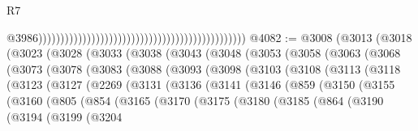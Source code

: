 \begin{lexlean}{R7}
\begin{coremodule}
                                                                                                  @3986)))))))))))))))))))))))))))))))))))))))))))))))
@4082 := @3008
    (@3013
      (@3018
        (@3023
          (@3028
            (@3033
              (@3038
                (@3043
                  (@3048
                    (@3053
                      (@3058
                        (@3063
                          (@3068
                            (@3073
                              (@3078
                                (@3083
                                  (@3088
                                    (@3093
                                      (@3098
                                        (@3103
                                          (@3108
                                            (@3113
                                              (@3118
                                                (@3123
                                                  (@3127
                                                    (@2269
                                                      (@3131
                                                        (@3136
                                                          (@3141
                                                            (@3146
                                                              (@859
                                                                (@3150
                                                                  (@3155
                                                                    (@3160
                                                                      (@805
                                                                        (@854
                                                                          (@3165
                                                                            (@3170
                                                                              (@3175
                                                                                (@3180
                                                                                  (@3185
                                                                                    (@864
                                                                                      (@3190
                                                                                        (@3194
                                                                                          (@3199
                                                                                            (@3204

\end{coremodule}
\end{lexlean}
